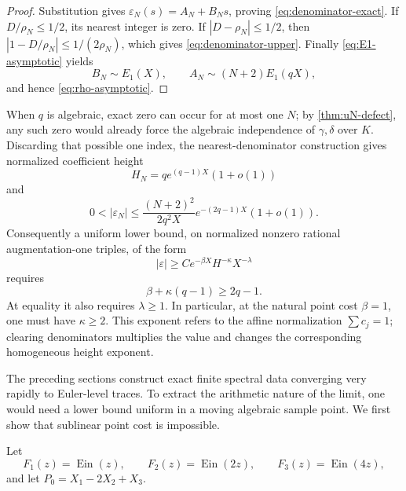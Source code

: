 \documentclass[11pt]{article}
\theoremstyle{keio}
\theoremstyle{definition}
\theoremstyle{remark}
\newcommand{\Ein}{\operatorname{Ein}}
\begin{document}
\begin{proof}
Substitution gives \(\varepsilon_N(s)=A_N+B_Ns\), proving
\eqref{eq:denominator-exact}.  If \(D/\rho_N\le1/2\), its nearest integer
is zero.  If \(|D-\rho_N|\le1/2\), then
\(|1-D/\rho_N|\le1/(2\rho_N)\), which gives
\eqref{eq:denominator-upper}.  Finally \eqref{eq:E1-asymptotic} yields
\[
 B_N\sim E_1(X),
 \qquad
 A_N\sim(N+2)E_1(qX),
\]
and hence \eqref{eq:rho-asymptotic}.
\end{proof}

When \(q\) is algebraic, exact zero can occur for at most one \(N\); by
\cref{thm:uN-defect}, any such zero would already force the algebraic
independence of \(\gamma,\delta\) over \(K\).  Discarding that possible one
index, the nearest-denominator construction gives normalized coefficient
height
\[
 H_N=q e^{(q-1)X}(1+o(1))
\]
and
\begin{equation}\label{eq:critical-height-upper}
 0<|\varepsilon_N|
 \le\frac{(N+2)^2}{2q^2X}
 e^{-(2q-1)X}(1+o(1)).
\end{equation}
Consequently a uniform lower bound, on normalized nonzero rational
augmentation-one triples, of the form
\[
 |\varepsilon|\ge C e^{-\beta X}H^{-\kappa}X^{-\lambda}
\]
requires
\begin{equation}\label{eq:height-frontier}
 \boxed{\beta+\kappa(q-1)\ge2q-1.}
\end{equation}
At equality it also requires \(\lambda\ge1\).  In particular, at the natural
point cost \(\beta=1\), one must have \(\kappa\ge2\).  This exponent refers
to the affine normalization \(\sum c_j=1\); clearing denominators multiplies
the value and changes the corresponding homogeneous height exponent.

The preceding sections construct exact finite spectral data converging very
rapidly to Euler-level traces.  To extract the arithmetic nature of the
limit, one would need a lower bound uniform in a moving algebraic sample
point.  We first show that sublinear point cost is impossible.

Let
\[
 F_1(z)=\Ein(z),\qquad
 F_2(z)=\Ein(2z),\qquad
 F_3(z)=\Ein(4z),
\]
and let \(P_0=X_1-2X_2+X_3\).
\end{document}
